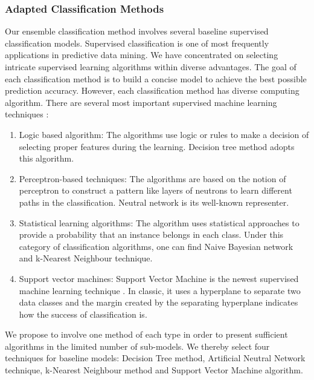 \documentclass[12pt]{article}
\begin{document}
\subsubsection{Adapted Classification Methods}
Our ensemble classification method involves several baseline supervised classification models. Supervised classification is one of most frequently applications in predictive data mining. We have concentrated on selecting intricate supervised learning algorithms within diverse advantages. The goal of each classification method is to build a concise model to achieve the best possible prediction accuracy. However, each classification method has diverse computing algorithm. There are several most important supervised machine learning techniques \cite{Kotsiantis}:\\
\begin{enumerate}[label=\alph*)]
	\item Logic based algorithm: The algorithms use logic or rules to make a decision of selecting proper features during the learning. Decision tree method adopts this algorithm.
	\item Perceptron-based techniques: The algorithms are based on the notion of perceptron to construct a pattern like layers of neutrons to learn different paths in the classification. Neutral network is its well-known representer.
	\item Statistical learning algorithms: The algorithm uses statistical approaches to provide a probability that an instance belongs in each class. Under this category of classification algorithms, one can find Naive Bayesian network and k-Nearest Neighbour technique.
	\item Support vector machines: Support Vector Machine is the newest supervised machine learning technique \cite{Kotsiantis}. In classic, it uses a hyperplane to separate two data classes and the margin created by the separating hyperplane indicates how the success of classification is. \\
\end{enumerate}

We propose to involve one method of each type in order to present sufficient algorithms in the limited number of sub-models. We thereby select four techniques for baseline models: Decision Tree method, Artificial Neutral Network technique, k-Nearest Neighbour method and Support Vector Machine algorithm.
\\
\end{document}

